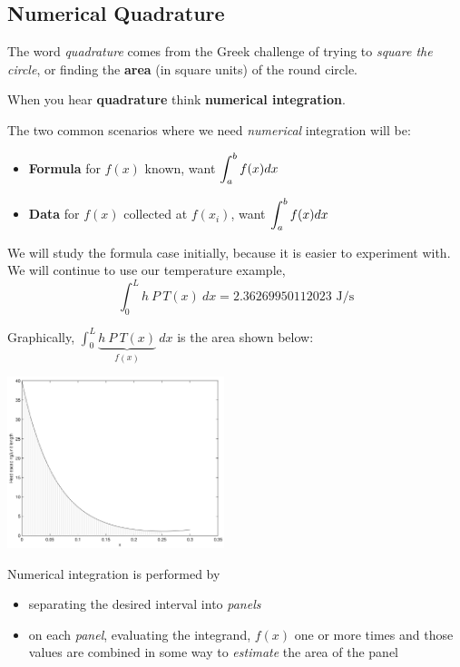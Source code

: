 \newpage

\subsection*{Numerical Quadrature}

The word {\em quadrature} comes from the Greek challenge of trying to
{\em square the circle}, or finding the {\bf area} (in square units)
of the round circle.

When you hear {\bf quadrature} think {\bf numerical integration}.

The two common scenarios where we need {\em numerical} integration will be:
\begin{itemize}
\item {\bf Formula} for $f(x)$ known, want $\displaystyle \int_a^b f(x) dx$
\item {\bf Data} for $f(x)$ collected at $f(x_i)$, want $\displaystyle \int_a^b f(x)
  dx$
\end{itemize}
We will study the formula case initially, because it is easier to
experiment with.  We will continue to use our temperature example,
$$
\int_0^{L} h ~P ~T(x) ~dx = 2.36269950112023 \mbox{ J/s}
$$

\newpage

Graphically, $\displaystyle \int_0^L \underbrace{h~P~T(x)}_{f(x)}~dx$
is the area shown below:
\begin{center}
\includegraphics[height=5cm]{graphics/notes_06_f_graph_with_area}
\end{center}
Numerical integration is performed by  
\begin{itemize}
\item separating the desired interval into {\em panels}
\item on each {\em panel}, evaluating the integrand, $f(x)$ one or
  more times and those values are combined in some way to {\em estimate}
  the area of the panel
\end{itemize}

\newpage

